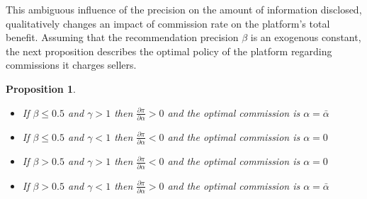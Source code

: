 \documentclass[a4paper]{article}
\newtheorem{proposition}[theorem]{Proposition}
\begin{document}
This ambiguous influence of the precision on the amount of information disclosed, qualitatively changes an impact of commission rate on the platform's total benefit. Assuming that the recommendation precision $\beta$ is an exogenous constant, the next proposition describes the optimal policy of the platform regarding commissions it charges sellers.



\begin{proposition}\label{profit_beta}
	\leavevmode 
	\begin{itemize}
		\item If $\beta \le 0.5$ and  $\gamma > 1$ then $\frac{\partial \pi }{\partial \alpha} > 0$ and the optimal commission is $\alpha = \bar{\alpha}$
		\item  If $\beta \le 0.5$ and $\gamma < 1$ then $\frac{\partial \pi }{\partial \alpha} < 0$ and the optimal commission is $\alpha = 0$	
		\item If $\beta > 0.5$ and  $\gamma > 1$ then $\frac{\partial \pi }{\partial \alpha} < 0$ and the optimal commission is $\alpha = 0$
		\item If $\beta > 0.5$ and $\gamma < 1$ then $\frac{\partial \pi }{\partial \alpha} > 0$ and the optimal commission is $\alpha = \bar{\alpha}$
	\end{itemize}
\end{proposition}
\end{document}
